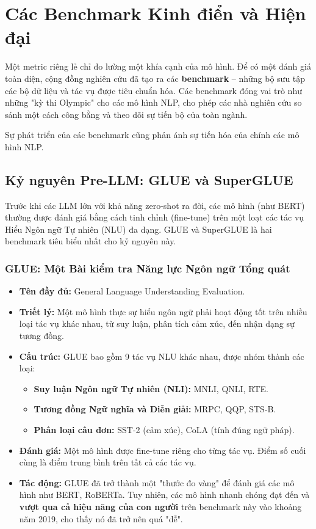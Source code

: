
\section{Các Benchmark Kinh điển và Hiện đại}
\label{sec:benchmarks}

Một metric riêng lẻ chỉ đo lường một khía cạnh của mô hình. Để có một đánh giá toàn diện, cộng đồng nghiên cứu đã tạo ra các \textbf{benchmark} -- những bộ sưu tập các bộ dữ liệu và tác vụ được tiêu chuẩn hóa. Các benchmark đóng vai trò như những "kỳ thi Olympic" cho các mô hình NLP, cho phép các nhà nghiên cứu so sánh một cách công bằng và theo dõi sự tiến bộ của toàn ngành.

Sự phát triển của các benchmark cũng phản ánh sự tiến hóa của chính các mô hình NLP.

\subsection{Kỷ nguyên Pre-LLM: GLUE và SuperGLUE}
\label{ssec:pre_llm_benchmarks}
Trước khi các LLM lớn với khả năng zero-shot ra đời, các mô hình (như BERT) thường được đánh giá bằng cách tinh chỉnh (fine-tune) trên một loạt các tác vụ Hiểu Ngôn ngữ Tự nhiên (NLU) đa dạng. GLUE và SuperGLUE là hai benchmark tiêu biểu nhất cho kỷ nguyên này.

\subsubsection{GLUE: Một Bài kiểm tra Năng lực Ngôn ngữ Tổng quát}
\begin{itemize}
    \item \textbf{Tên đầy đủ:} General Language Understanding Evaluation.
    \item \textbf{Triết lý:} Một mô hình thực sự hiểu ngôn ngữ phải hoạt động tốt trên nhiều loại tác vụ khác nhau, từ suy luận, phân tích cảm xúc, đến nhận dạng sự tương đồng.
    \item \textbf{Cấu trúc:} GLUE bao gồm 9 tác vụ NLU khác nhau, được nhóm thành các loại:
        \begin{itemize}
            \item \textbf{Suy luận Ngôn ngữ Tự nhiên (NLI):} MNLI, QNLI, RTE.
            \item \textbf{Tương đồng Ngữ nghĩa và Diễn giải:} MRPC, QQP, STS-B.
            \item \textbf{Phân loại câu đơn:} SST-2 (cảm xúc), CoLA (tính đúng ngữ pháp).
        \end{itemize}
    \item \textbf{Đánh giá:} Một mô hình được fine-tune riêng cho từng tác vụ. Điểm số cuối cùng là điểm trung bình trên tất cả các tác vụ.
    \item \textbf{Tác động:} GLUE đã trở thành một "thước đo vàng" để đánh giá các mô hình như BERT, RoBERTa. Tuy nhiên, các mô hình nhanh chóng đạt đến và \textbf{vượt qua cả hiệu năng của con người} trên benchmark này vào khoảng năm 2019, cho thấy nó đã trở nên quá "dễ".
\end{itemize}

